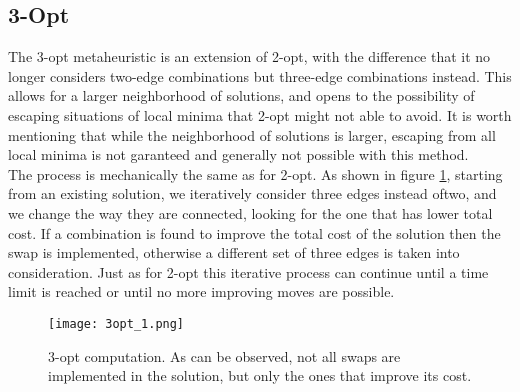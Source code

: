 \subsection{3-Opt}
The 3-opt metaheuristic is an extension of 2-opt, with the difference that it no longer considers two-edge combinations but three-edge
combinations instead. This allows for a larger neighborhood of solutions, and opens to the possibility of escaping situations of local minima
that 2-opt might not able to avoid. It is worth mentioning that while the neighborhood of solutions is larger, escaping from all
local minima is not garanteed and generally not possible with this method.\\
The process is mechanically the same as for 2-opt. As shown in figure \ref{fig:3-opt}, starting from an existing solution, we iteratively 
consider three edges instead oftwo, and we change the way they are connected, looking for the one that has lower total cost. If a combination 
is found to improve the total cost of the solution then the swap is implemented, otherwise a different set of three edges is taken into consideration.
Just as for 2-opt this iterative process can continue until a time limit is reached or until no more improving moves are possible.

\begin{figure}
    \centering
    \texttt{[image: 3opt\_1.png]}
    \caption{3-opt computation. As can be observed, not all swaps are implemented in the solution, but only the ones that improve its cost.}
    \label{fig:3-opt}
\end{figure}

